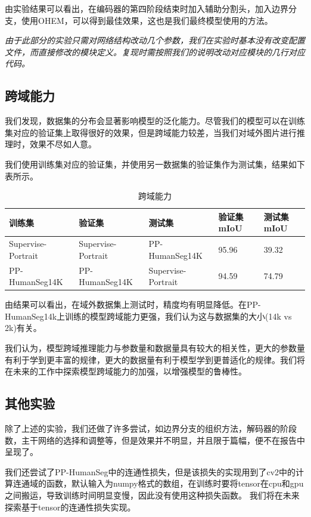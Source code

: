 \documentclass[11pt]{article}
\begin{document}
由实验结果可以看出，在编码器的第四阶段结束时加入辅助分割头，加入边界分支，使用OHEM，可以得到最佳效果，这也是我们最终模型使用的方法。

\textit{由于此部分的实验只需对网络结构改动几个参数，我们在实验时基本没有改变配置文件，而直接修改的模块定义。复现时需按照我们的说明改动对应模块的几行对应代码。}


\subsection{跨域能力}
我们发现，数据集的分布会显著影响模型的泛化能力。尽管我们的模型可以在训练集对应的验证集上取得很好的效果，但是跨域能力较差，当我们对域外图片进行推理时，效果不尽如人意。

我们使用训练集对应的验证集，并使用另一数据集的验证集作为测试集，结果如下表所示。

\begin{table}[!ht]
  \centering
  \begin{tabular}{|l|l|l|l|l|}
  \hline
      训练集 & 验证集 & 测试集 & 验证集mIoU & 测试集mIoU \\ \hline
      Supervise-Portrait & Supervise-Portrait & PP-HumanSeg14K & 95.96 & 39.32 \\ \hline
      PP-HumanSeg14K & PP-HumanSeg14K & Supervise-Portrait & 94.59 & 74.79 \\ \hline
  \end{tabular}
  \caption{跨域能力}
\end{table}
由结果可以看出，在域外数据集上测试时，精度均有明显降低。在PP-HumanSeg14k上训练的模型跨域能力更强，我们认为这与数据集的大小(14k vs 2k)有关。

我们认为，模型跨域推理能力与参数量和数据量具有较大的相关性，更大的参数量有利于学到更丰富的规律，更大的数据量有利于模型学到更普适化的规律。我们将在未来的工作中探索模型跨域能力的加强，以增强模型的鲁棒性。
\subsection{其他实验}

除了上述的实验，我们还做了许多尝试，如边界分支的组织方法，解码器的阶段数，主干网络的选择和调整等，但是效果并不明显，并且限于篇幅，便不在报告中呈现了。

我们还尝试了PP-HumanSeg\cite{ref42}中的连通性损失，但是该损失的实现用到了cv2中的计算连通域的函数，默认输入为numpy格式的数组，在训练时要将tensor在cpu和gpu之间搬运，导致训练时间明显变慢，因此没有使用这种损失函数。
我们将在未来探索基于tensor的连通性损失实现。
\end{document}
